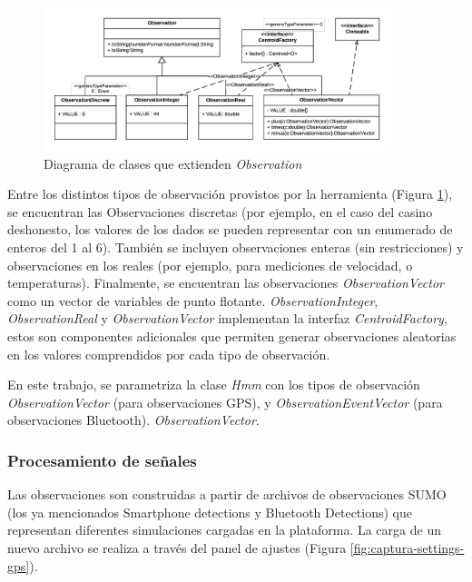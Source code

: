 \begin{figure}[!htp]
	\centering
	\includegraphics[width=0.9\textwidth]{images/jahmm-obs.png}
	\captionsetup{width=0.7\textwidth}
	\caption{Diagrama de clases que extienden \textit{Observation}}
    \label{fig:jahmm-obs}
\end{figure}

Entre los distintos tipos de observación provistos por la herramienta (Figura \ref{fig:jahmm-obs}), se encuentran las Observaciones discretas (por ejemplo, en el caso del casino deshonesto, los valores de los dados se pueden representar con un enumerado de enteros del 1 al 6). También se incluyen observaciones enteras (sin restricciones) y observaciones en los reales (por ejemplo, para mediciones de velocidad, o temperaturas). Finalmente, se encuentran las observaciones \textit{ObservationVector} como un vector de variables de punto flotante. \textit{ObservationInteger}, \textit{ObservationReal} y \textit{ObservationVector} implementan la interfaz \textit{CentroidFactory}, estos son componentes adicionales que permiten generar observaciones aleatorias en los valores comprendidos por cada tipo de observación.

En este trabajo, se parametriza la clase \textit{Hmm} con los tipos de observación \textit{ObservationVector} (para observaciones GPS), y \textit{ObservationEventVector} (para observaciones Bluetooth).  \textit{ObservationVector}.

\subsubsection{Procesamiento de señales}
Las observaciones son construidas a partir de archivos de observaciones SUMO (los ya mencionados Smartphone detections y Bluetooth Detections) que representan diferentes simulaciones cargadas en la plataforma. La carga de un nuevo archivo se realiza a través del panel de ajustes (Figura \ref{fig:captura-settings-gps}).


